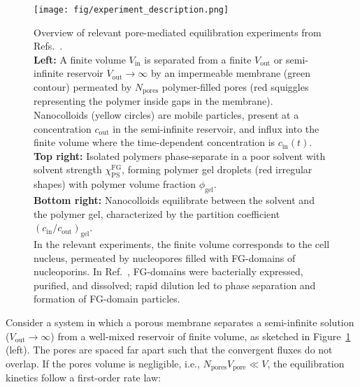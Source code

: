 \documentclass[10pt, a4paper]{article}
\begin{document}
\begin{multicols}{2}

    \begin{figure}[H]
        \centering
        \texttt{[image: fig/experiment\_description.png]}
        \caption{Overview of relevant pore-mediated equilibration experiments from Refs.~\cite{Ribbeck2001, Mohr2009, Popken2015, Timney2016, Frey2018}.\\
        \textbf{Left:} A finite volume $V_{\text{in}}$ is separated from a finite $V_\text{out}$ or semi-infinite reservoir $V_\text{out}\to \infty$  by an impermeable membrane (green contour) permeated by $N_{\text{pores}}$ polymer-filled pores (red squiggles representing the polymer inside gaps in the membrane). 
        Nanocolloids (yellow circles) are mobile particles, present at a concentration $c_{\text{out}}$ in the semi-infinite reservoir, and influx into the finite volume where the time-dependent concentration is $c_{\text{in}}(t)$.\\
        \textbf{Top right:} Isolated polymers phase-separate in a poor solvent with solvent strength $\chi_{\text{PS}}^{\text{FG}}$, forming polymer gel droplets (red irregular shapes) with polymer volume fraction $\phi_{\text{gel}}$.\\
        \textbf{Bottom right:} Nanocolloids equilibrate between the solvent and the polymer gel, characterized by the partition coefficient $\left(c_{\text{in}}/c_{\text{out}}\right)_{\text{gel}}$.\\
        In the relevant experiments, the finite volume corresponds to the cell nucleus, permeated by nucleopores filled with FG-domains of nucleoporins. 
        In Ref.~\cite{Frey2018}, FG-domains were bacterially expressed, purified, and dissolved; rapid dilution led to phase separation and formation of FG-domain particles. 
        }
        \label{fig:experiments_overview}
    \end{figure}
    

Consider a system in which a porous membrane separates a semi-infinite solution ($V_{\text{out}} \to \infty$) from a well-mixed reservoir of finite volume, as sketched in Figure~\ref{fig:experiments_overview} (left).
The pores are spaced far apart such that the convergent fluxes do not overlap.
If the pores volume is negligible, i.e., $N_{\text{pores}}V_{\text{pore}} \ll V$, the equilibration kinetics follow a first-order rate law:


\end{multicols}
\end{document}

